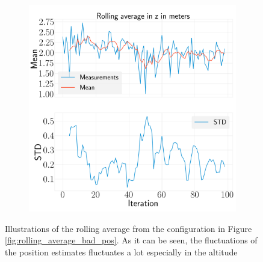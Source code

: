 \documentclass[../Head/report.tex]{subfiles}
\begin{document}
\begin{figure}[H]
\begin{subfigure}[t]{.30\textwidth}
        \caption{}
        \label{fig:rolling_average_in_y_test2}
    \end{subfigure}
     \hspace{0.2em}
    \begin{subfigure}[t]{.30\textwidth}
        \centering
        \includegraphics[width=\textwidth]{../Figures/analyse_rolling_average/test2/Calculated_rolling_average_in_z_with_mean_and_STD.png}
        \caption{}
        \label{fig:rolling_average_in_z_test2}
    \end{subfigure}
    \caption{Illustrations of the rolling average from the configuration in Figure \ref{fig:rolling_average_bad_pos}. As it can be seen, the fluctuations of the position estimates fluctuates a lot especially in the altitude}
    \label{fig:rolling_average_pos_test2}
\end{figure}
\end{document}
